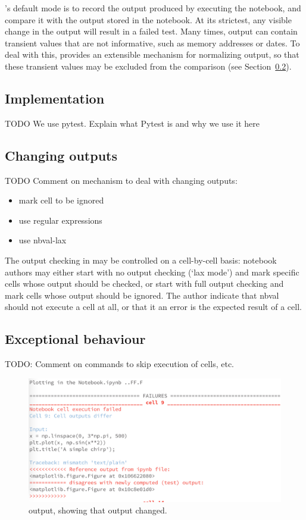 \documentclass{deliverablereport}
\begin{document}
\nbval's default mode is to record the output produced by executing
the notebook, and compare it with the output stored in the notebook.
At its strictest, any visible change in the output will result in a
failed test.  Many times, output can contain transient values that are
not informative, such as memory addresses or dates.  To deal with
this, \nbval provides an extensible mechanism for normalizing output,
so that these transient values may be excluded from the comparison
(see Section~\ref{sec:changing-outputs}).

\subsection{Implementation}
TODO We use pytest. Explain what Pytest is and why we use it here

\subsection{Changing outputs}\label{sec:changing-outputs}
TODO Comment on mechanism to deal with changing outputs:
\begin{itemize}
\item mark cell to be ignored
\item use regular expressions
\item use nbval-lax
\end{itemize}

The output checking in \nbval may be controlled on a cell-by-cell
basis: notebook authors may either start with no output checking (`lax
mode') and mark specific cells whose output should be checked, or
start with full output checking and mark cells whose output should be
ignored.  The author indicate that nbval should not execute a cell at
all, or that it an error is the expected result of a cell.

\subsection{Exceptional behaviour}
TODO: Comment on commands to skip execution of cells, etc.
\begin{figure}[ht]
  \centering
  \includegraphics[width=.7\textwidth]{img/nbval-terminal}
  \caption{\nbval output, showing that output changed.}\label{fig:nbval}
\end{figure}
\end{document}
